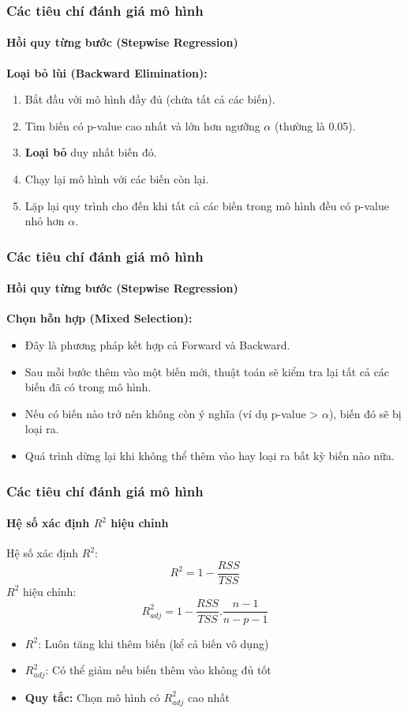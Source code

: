 \begin{frame}
    \frametitle{Các tiêu chí đánh giá mô hình}
    \framesubtitle{Hồi quy từng bước (Stepwise Regression)}

    \textbf{Loại bỏ lùi (Backward Elimination):}
    \begin{enumerate}
        \item Bắt đầu với mô hình đầy đủ (chứa tất cả các biến).
        \item Tìm biến có p-value cao nhất và lớn hơn ngưỡng $\alpha$ (thường là 0.05).
        \item \textbf{Loại bỏ} duy nhất biến đó.
        \item Chạy lại mô hình với các biến còn lại.
        \item Lặp lại quy trình cho đến khi tất cả các biến trong mô hình đều có p-value nhỏ hơn $\alpha$.
    \end{enumerate}
\end{frame}

\begin{frame}
    \frametitle{Các tiêu chí đánh giá mô hình}
    \framesubtitle{Hồi quy từng bước (Stepwise Regression)}
    
    \textbf{Chọn hỗn hợp (Mixed Selection):}
    \begin{itemize}
        \item Đây là phương pháp kết hợp cả Forward và Backward.
        \item Sau mỗi bước thêm vào một biến mới, thuật toán sẽ kiểm tra lại tất cả các biến đã có trong mô hình.
        \item Nếu có biến nào trở nên không còn ý nghĩa (ví dụ p-value > $\alpha$), biến đó sẽ bị loại ra.
        \item Quá trình dừng lại khi không thể thêm vào hay loại ra bất kỳ biến nào nữa.
    \end{itemize}
\end{frame}

\begin{frame}
    \frametitle{Các tiêu chí đánh giá mô hình}
    \framesubtitle{Hệ số xác định $R^2$ hiệu chỉnh}
    Hệ số xác định $R^2$:
    \[
    R^2 = 1 - \frac{RSS}{TSS} 
    \]
    $R^2$ hiệu chỉnh:
    \[
    R^2_{adj} = 1 - \frac{RSS}{TSS}.\frac{n-1}{n-p-1}
    \]
    \begin{itemize}
        \item $R^2$: Luôn tăng khi thêm biến (kể cả biến vô dụng)
        \item $R^2_{adj}$: Có thể giảm nếu biến thêm vào không đủ tốt
        \item \textbf{Quy tắc:} Chọn mô hình có $R^2_{adj}$ cao nhất
    \end{itemize}
\end{frame}

